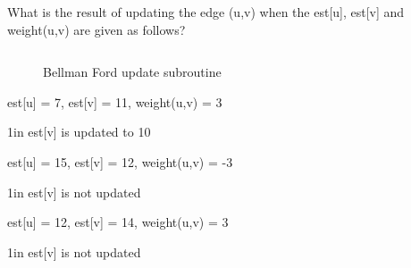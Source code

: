 \begin{prob}
	What is the result of updating the edge (u,v) when the est[u], est[v] and weight(u,v) are given as follows?
	
    \begin{figure}[h!]
        \caption{Bellman Ford update subroutine}
        \inputminted{python}{\thisdir/include/update.py}
    \end{figure}

	\begin{subprobset}
	    \begin{subprob}
		est[u] = 7, est[v] = 11, weight(u,v) = 3
		\begin{responsebox}{1in}
		    est[v] is updated to 10
		\end{responsebox}	
	    \end{subprob}
	    \begin{subprob}
		est[u] = 15, est[v] = 12, weight(u,v) = -3
		\begin{responsebox}{1in}
		    est[v] is not updated
		\end{responsebox}	
	    \end{subprob}
	    \begin{subprob}
		est[u] = 12, est[v] = 14, weight(u,v) = 3
		\begin{responsebox}{1in}
		    est[v] is not updated
		\end{responsebox}	
	    \end{subprob}
	\end{subprobset}
\end{prob}
